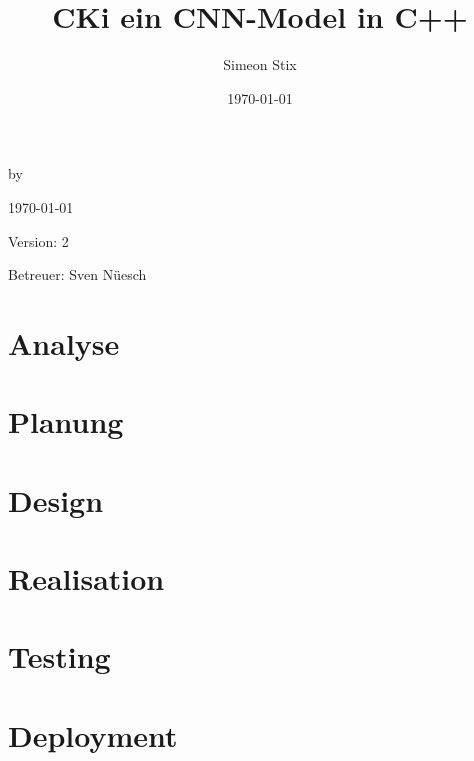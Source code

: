\documentclass[a4paper,oneside,12pt]{report}
\title{CKi ein CNN-Model in C++}
\author{Simeon Stix}
\date{\today}
\renewcommand{\maketitle}{
\begin{titlepage}
    \begin{center}
        \vspace*{1cm}
        
        \Huge
        \textbf{\thetitle}
        
        \vspace{0.5cm}
        \Large
        by \theauthor
        
        \vspace{1.5cm}
        
        \today
        
        \vfill
        
        Version: 2
        
        \vspace{1cm}
        
        Betreuer: Sven Nüesch
        
    \end{center}
\end{titlepage}
}
\begin{document}
\maketitle

\pagestyle{plain} %

\tableofcontents %
\setcounter{secnumdepth}{4} %
\setcounter{tocdepth}{3} %

\chapter{Analyse}
\label{sec:Analyse}


\chapter{Planung}
\label{sec:Planung}


\chapter{Design}
\label{sec:Design}


\chapter{Realisation}
\label{sec:Realisation}


\chapter{Testing}
\label{sec:Testing}


\chapter{Deployment}
\label{sec:Deployment}



\clearpage
{}
\nocite{*} %
\end{document}
